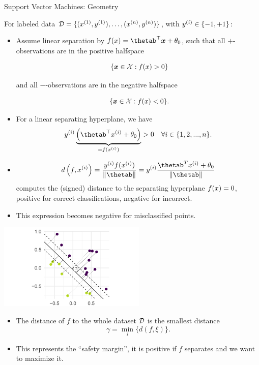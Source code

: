 \begin{vbframe}{Support Vector Machines: Geometry}

For labeled data $\mathcal{D} = \{ (x^{(1)}, y^{(1)}), \ldots, (x^{(n)}, y^{(n)})\}$, with $y^{(i)} \in \{-1, +1\}$:
\begin{itemize}
  \item Assume linear separation by $\fx = \thetab^\top \xv + \theta_0$, such that all $+$-observations are in the positive halfspace

  $$
  \phantom{i}\{\bm{x} \in \mathcal{X}: f(x) > 0\}
  $$

  and all $-$-observations are in the negative halfspace

  $$
  \phantom{i}\{\bm{x} \in \mathcal{X} : f(x) < 0\}.
  $$

  \item For a linear separating hyperplane, we have
  $$
    \yi \underbrace{\left(\thetab^\top \xi + \theta_0\right)}_{= \fxi} > 0 \quad \forall i \in \{1, 2, ..., n\}.
  $$

  \item 
  $$
    d \left(f, \xi \right) = \frac{\yi \fxi}{\|\thetab\|} = \yi \frac{\thetab^T \xi + \theta_0}{\|\thetab\|}
  $$
  computes the (signed) distance to the separating hyperplane $f(x) = 0$,
    positive for correct classifications, negative for incorrect.
  \item This expression becomes negative for misclassified points.
\end{itemize}


\begin{center}
\includegraphics[width =7cm]{figure_man/svm-geometry01.png} \\
\end{center}


\framebreak

\begin{itemize}
    \item The distance of $f$ to the whole dataset $\mathcal{D}$
    is the smallest distance
    $$
    \gamma = \min\limits_i \Big\{ d \left(f, \xi \right) \Big\}.
    $$
    \item This represents the \enquote{safety margin}, it is positive if $f$ separates and we want to maximize it.
\end{itemize}



\end{vbframe}
